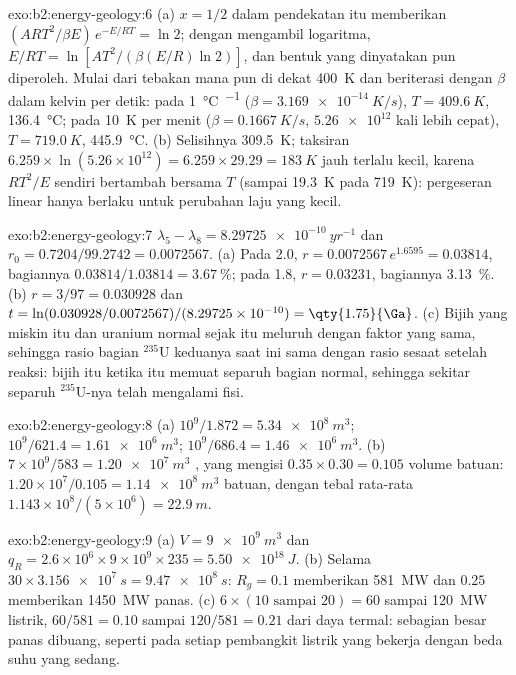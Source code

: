 \begin{solution}{exo:b2:energy-geology:6}
(a) $x = 1/2$ dalam pendekatan itu memberikan $(ART^2/\beta E)\,e^{-E/RT} = \ln 2$; dengan mengambil logaritma,
$E/RT = \ln[AT^2/(\beta(E/R)\ln 2)]$, dan bentuk yang dinyatakan pun diperoleh. Mulai dari tebakan mana pun di dekat
\qty{400}{K} dan beriterasi dengan $\beta$ dalam kelvin per detik: pada \qty{1}{\celsius\per\Ma}
($\beta = \qty{3.169e-14}{K/s}$), $T = \qty{409.6}{K}$, \qty{136.4}{\celsius}; pada \qty{10}{K} per
menit ($\beta = \qty{0.1667}{K/s}$, $\num{5.26e12}$ kali lebih cepat), $T = \qty{719.0}{K}$,
\qty{445.9}{\celsius}. (b) Selisihnya \qty{309.5}{K}; taksiran $6.259 \times
\ln(5.26 \times 10^{12}) = 6.259 \times 29.29 = \qty{183}{K}$ jauh terlalu kecil, karena $RT^2/E$
sendiri bertambah bersama $T$ (sampai \qty{19.3}{K} pada \qty{719}{K}): pergeseran linear hanya berlaku untuk perubahan
laju yang kecil.
\end{solution}

\begin{solution}{exo:b2:energy-geology:7}
$\lambda_5 - \lambda_8 = \qty{8.29725e-10}{yr^{-1}}$ dan $r_0 = 0.7204/99.2742 = 0.0072567$.
(a) Pada \qty{2.0}{\Ga}, $r = 0.0072567\,e^{1.6595} = 0.03814$, bagiannya $0.03814/1.03814 =
\qty{3.67}{\percent}$; pada \qty{1.8}{\Ga}, $r = 0.03231$, bagiannya \qty{3.13}{\percent}. (b) $r =
3/97 = 0.030928$ dan $t = \ln(0.030928/0.0072567)/(8.29725 \times 10^{-10}) = \qty{1.75}{\Ga}$.
(c) Bijih yang miskin itu dan uranium normal sejak itu meluruh dengan faktor yang sama, sehingga rasio
bagian $^{235}$U keduanya saat ini sama dengan rasio sesaat setelah reaksi: bijih itu ketika itu memuat separuh bagian
normal, sehingga sekitar separuh $^{235}$U-nya telah mengalami fisi.
\end{solution}

\begin{solution}{exo:b2:energy-geology:8}
(a) $10^9/1.872 = \qty{5.34e8}{m^3}$; $10^9/621.4 = \qty{1.61e6}{m^3}$; $10^9/686.4 =
\qty{1.46e6}{m^3}$. (b) $7 \times 10^9/583 = \qty{1.20e7}{m^3}$ , yang mengisi
$0.35 \times 0.30 = 0.105$ volume batuan: $1.20 \times 10^7/0.105 = \qty{1.14e8}{m^3}$ batuan,
dengan tebal rata-rata $1.143 \times 10^8/(5 \times 10^6) = \qty{22.9}{m}$.
\end{solution}

\begin{solution}{exo:b2:energy-geology:9}
(a) $V = \qty{9e9}{m^3}$ dan $q_R = 2.6 \times 10^6 \times 9 \times 10^9 \times 235 =
\qty{5.50e18}{J}$. (b) Selama $30 \times \qty{3.156e7}{s} = \qty{9.47e8}{s}$: $R_g = 0.1$ memberikan
\qty{581}{MW} dan $0.25$ memberikan \qty{1450}{MW} panas. (c) $6 \times (10 \text{ sampai } 20) = 60$ sampai
\qty{120}{MW} listrik, $60/581 = 0.10$ sampai $120/581 = 0.21$ dari daya termal: sebagian besar
panas dibuang, seperti pada setiap pembangkit listrik yang bekerja dengan beda suhu yang sedang.
\end{solution}

